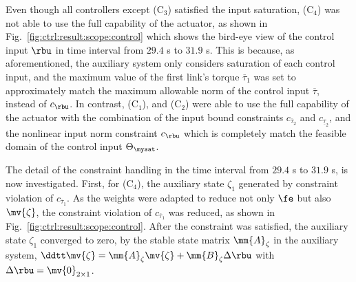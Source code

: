 \documentclass[lettersize,journal]{IEEEtran}
\begin{document}
Even though all controllers except (C$_3$) satisfied the input saturation, (C$_4$) was not able to use the full capability of the actuator, as shown in Fig.~\ref{fig:ctrl:result:scope:control} which shows the bird-eye view of the control input $\rbu$ in time interval from $29.4$ s to $31.9$ s.
This is because, as aforementioned, the auxiliary system only considers saturation of each control input, and the maximum value of the first link's torque $\overline{\tau}_1$ was set to approximately match the maximum allowable norm of the control input $\overline\tau$, instead of $c_{\rbu}$.
In contrast, (C$_1$), and (C$_2$) were able to use the full capability of the actuator with the combination of the input bound constraints $c_{\overline\tau_2}$ and $c_{\underline\tau_2}$, and the nonlinear input norm constraint $c_{\rbu}$ which is completely match the feasible domain of the control input $\Theta_{\mysat}$.

The detail of the constraint handling in the time interval from $29.4$ s to $31.9$ s, is now investigated.
First, for (C$_4$), the auxiliary state $\zeta_1$ generated by constraint violation of $c_{\overline\tau_1}$. 
As the weights were adapted to reduce not only $\fe$ but also $\mv{\zeta}$, the constraint violation of $c_{\overline\tau_1}$ was reduced, as shown in Fig.~\ref{fig:ctrl:result:scope:control}.
After the constraint was satisfied, the auxiliary state $\zeta_1$ converged to zero, by the stable state matrix $\mm{A}_\zeta$ in the auxiliary system, \ie $\ddtt\mv{\zeta} = \mm{A}_\zeta \mv{\zeta} + \mm{B}_\zeta \Delta\rbu$ with $\Delta\rbu=\mv{0}_{2\times1}$.
\end{document}
